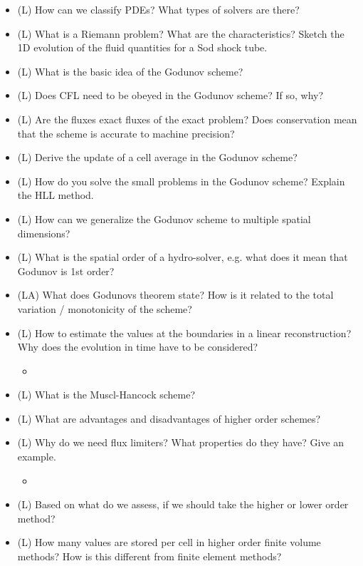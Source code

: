 \begin{itemize}
    \item (L) How can we classify PDEs? What types of solvers are there?
    \item (L) What is a Riemann problem? What are the characteristics? Sketch the 1D evolution of the fluid quantities for a Sod shock tube.
    \item (L) What is the basic idea of the Godunov scheme?
    \item (L) Does CFL need to be obeyed in the Godunov scheme? If so, why?
    \item (L) Are the fluxes exact fluxes of the exact problem? Does conservation mean that the scheme is accurate to machine precision?
    \item (L) Derive the update of a cell average in the Godunov scheme?
    \item (L) How do you solve the small problems in the Godunov scheme? Explain the HLL method.
    \item (L) How can we generalize the Godunov scheme to multiple spatial dimensions?
    \item (L) What is the spatial order of a hydro-solver, e.g. what does it mean that Godunov is 1st order?
    \item (LA) What does Godunovs theorem state? How is it related to the total variation / monotonicity of the scheme?
    \item (L) How to estimate the values at the boundaries in a linear reconstruction? Why does the evolution in time have to be considered?
    \begin{itemize}
        \item {}
    \end{itemize}
    \item (L) What is the Muscl-Hancock scheme?
    \item (L) What are advantages and disadvantages of higher order schemes?
    \item (L) Why do we need flux limiters? What properties do they have? Give an example.
    \begin{itemize}
        \item {}
    \end{itemize}
    \item (L) Based on what do we assess, if we should take the higher or lower order method?
    \item (L) How many values are stored per cell in higher order finite volume methods? How is this
    different from finite element methods?
\end{itemize}

